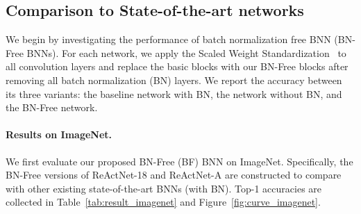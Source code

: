 \documentclass[final]{cvpr}
\begin{document}
\subsection{Comparison to State-of-the-art networks}
We begin by investigating the performance of batch normalization free BNN (BN-Free BNNs). For each network, we apply the Scaled Weight Standardization~\cite{brock2021agc} to all convolution layers and replace the basic blocks with our BN-Free blocks after removing all batch normalization (BN) layers. We report the accuracy between its three variants: the baseline network with BN, the network without BN, and the BN-Free network.

\paragraph{Results on ImageNet.} We first evaluate our proposed BN-Free (BF) BNN on ImageNet. Specifically, the BN-Free versions of ReActNet-18 and ReActNet-A are constructed to compare with other existing state-of-the-art BNNs (with BN). Top-1 accuracies are collected in Table~\ref{tab:result_imagenet} and Figure~\ref{fig:curve_imagenet}.



\begin{table}[htb]
\caption{Comparison of the top-1 accuracy with state-of-the-art binary methods on ImageNet. The accuracy of other binary networks are collected from the original papers, which include BNN~\cite{courbariaux2016binarized}, PCNN~\cite{gu2019projection}, XNOR-Net~\cite{rastegari2016xnor}, Bi-RealNet~\cite{liu2018bi}, Real-to-Binary Net~\cite{Martinez2020Training}, ReActNet-18 (BN) and ReActNet-A (BN)~\cite{liu2020reactnet}. ``w/o BN" denotes the version without batch normalization; ``BN-Free" represents our proposed BN-Free BNNs.}
\label{tab:result_imagenet}
\centering
{}
\vspace{-4mm}
\end{table}
\end{document}
